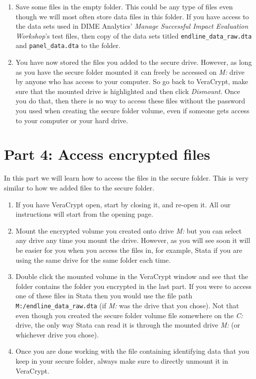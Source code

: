\documentclass{tufte-handout}
\begin{document}
\begin{enumerate}
	\item Save some files in the empty folder. This could be any type of files even though we will most often store data files in this folder. If you have access to the data sets used in DIME Analytics' \textit{Manage Successful Impact Evaluation Workshop}'s test files, then copy of the data sets titled \texttt{endline\_data\_raw.dta} and \texttt{panel\_data.dta} to the folder.
	
	\item You have now stored the files you added to the secure drive. However, as long as you have the secure folder mounted it can freely be accessed on \textit{M:} drive by anyone who has access to your computer. So go back to VeraCrypt, make sure that the mounted drive is highlighted and then click \textit{Dismount}. Once you do that, then there is no way to access these files without the password you used when creating the secure folder volume, even if someone gets access to your computer or your hard drive.
	
	
\end{enumerate}


\section{Part 4: Access encrypted files}

In this part we will learn how to access the files in the secure folder. This is very similar to how we added files to the secure folder.

\begin{enumerate}
	\item If you have VeraCrypt open, start by closing it, and re-open it. All our instructions will start from the opening page.
	\item Mount the encrypted volume you created onto drive \textit{M:} but you can select any drive any time you mount the drive. However, as you will see soon it will be easier for you when you access the files in, for example, Stata if you are using the same drive for the same folder each time.
	\item Double click the mounted volume in the VeraCrypt window and see that the folder contains the folder you encrypted in the last part. If you were to access one of these files in Stata then you would use the file path \texttt{M:/endline\_data\_raw.dta} (if \textit{M:} was the drive that you chose). Not that even though you created the secure folder volume file somewhere on the \textit{C:} drive, the only way Stata can read it is through the mounted drive \textit{M:} (or whichever drive you chose).
	\item Once you are done working with the file containing identifying data that you keep in your secure folder, always make sure to directly unmount it in VeraCrypt.   
\end{enumerate}
\end{document}
